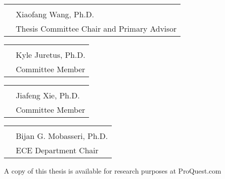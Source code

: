 \begin{tabular}{@{}p{.5in}p{4in}@{}}
& \hrulefill \\
& Xiaofang Wang, Ph.D. \\
& Thesis Committee Chair and Primary Advisor\\
\end{tabular}
\vfill
\begin{tabular}{@{}p{.5in}p{4in}@{}}
& \hrulefill \\
& Kyle Juretus, Ph.D. \\
& Committee Member\\
\end{tabular}
\vfill
\begin{tabular}{@{}p{.5in}p{4in}@{}}
& \hrulefill \\
& Jiafeng Xie, Ph.D.\\
& Committee Member\\
\end{tabular}
\vfill
\vspace{.3in}
\begin{tabular}{@{}p{.5in}p{4in}@{}}
& \hrulefill \\
& Bijan G. Mobasseri, Ph.D. \\
& ECE Department Chair\\
\end{tabular}

\vfill
\noindent
A copy of this thesis is available for research purposes at ProQuest.com
\clearpage
